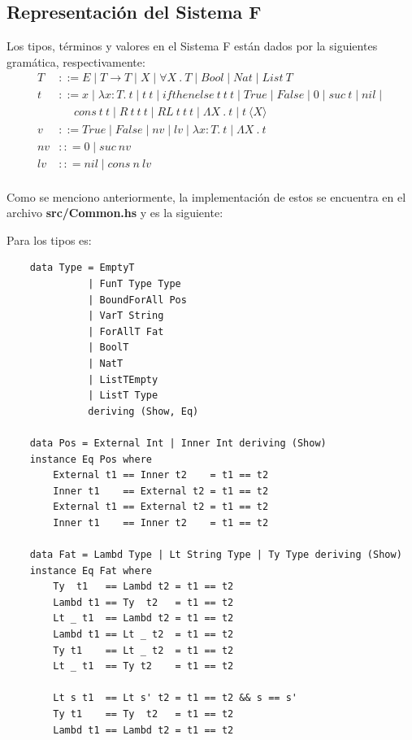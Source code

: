 \documentclass[12pt, titlepage, a4paper]{article}
\begin{document}
\subsection{Representación del Sistema F}
Los tipos, términos y valores en el Sistema F están dados por la siguientes gramática, respectivamente:
\begin{align*}
    T &::= E \mid T \rightarrow T \mid X \mid \forall X \ . \ T \mid Bool \mid Nat \mid List \ T\\
    t &::= x \mid \lambda x:T. \ t \mid t \ t \mid ifthenelse \ t \ t \ t \mid True \mid False \mid 0 \mid suc \ t \mid  nil \mid  \\
    & \ \ \ \ \ \ cons \ t \ t \mid R \ t \ t \ t \mid RL \ t \ t \ t \mid \Lambda X \ . \ t \mid t \ \langle X \rangle \\
    v &::= True \mid False \mid nv \mid lv \mid \lambda x:T. \ t \mid \Lambda X \ . \ t \\
    nv &:: = 0 \mid suc \ nv \\
    lv &:: = nil \mid cons \ n \ lv \\
\end{align*}

Como se menciono anteriormente, la implementación de estos se encuentra en el archivo \textbf{src/Common.hs} y es la siguiente:

\noindent Para los tipos es:
\begin{verbatim}
    data Type = EmptyT 
              | FunT Type Type
              | BoundForAll Pos
              | VarT String
              | ForAllT Fat
              | BoolT
              | NatT
              | ListTEmpty
              | ListT Type
              deriving (Show, Eq)

    data Pos = External Int | Inner Int deriving (Show)
    instance Eq Pos where
        External t1 == Inner t2    = t1 == t2
        Inner t1    == External t2 = t1 == t2
        External t1 == External t2 = t1 == t2
        Inner t1    == Inner t2    = t1 == t2
    
    data Fat = Lambd Type | Lt String Type | Ty Type deriving (Show)
    instance Eq Fat where
        Ty  t1   == Lambd t2 = t1 == t2
        Lambd t1 == Ty  t2   = t1 == t2
        Lt _ t1  == Lambd t2 = t1 == t2
        Lambd t1 == Lt _ t2  = t1 == t2
        Ty t1    == Lt _ t2  = t1 == t2
        Lt _ t1  == Ty t2    = t1 == t2
    
        Lt s t1  == Lt s' t2 = t1 == t2 && s == s'   
        Ty t1    == Ty  t2   = t1 == t2
        Lambd t1 == Lambd t2 = t1 == t2
\end{verbatim}
\end{document}
